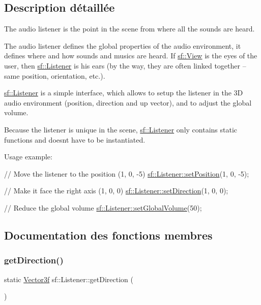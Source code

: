 \subsection{Description détaillée}
The audio listener is the point in the scene from where all the sounds are heard. 

The audio listener defines the global properties of the audio environment, it defines where and how sounds and musics are heard. If \hyperlink{classsf_1_1View}{sf\+::\+View} is the eyes of the user, then \hyperlink{classsf_1_1Listener}{sf\+::\+Listener} is his ears (by the way, they are often linked together -- same position, orientation, etc.).

\hyperlink{classsf_1_1Listener}{sf\+::\+Listener} is a simple interface, which allows to setup the listener in the 3D audio environment (position, direction and up vector), and to adjust the global volume.

Because the listener is unique in the scene, \hyperlink{classsf_1_1Listener}{sf\+::\+Listener} only contains static functions and doesn\textquotesingle{}t have to be instantiated.

Usage example\+: 
\begin{DoxyCode}
\textcolor{comment}{// Move the listener to the position (1, 0, -5)}
\hyperlink{classsf_1_1Listener_a5bc2d8d18ea2d8f339d23cbf17678564}{sf::Listener::setPosition}(1, 0, -5);

\textcolor{comment}{// Make it face the right axis (1, 0, 0)}
\hyperlink{classsf_1_1Listener_ae479dc15513c6557984d26e32d06d06e}{sf::Listener::setDirection}(1, 0, 0);

\textcolor{comment}{// Reduce the global volume}
\hyperlink{classsf_1_1Listener_a803a24a1fc04620cacc9f88c6fbc0e3a}{sf::Listener::setGlobalVolume}(50);
\end{DoxyCode}
 

\subsection{Documentation des fonctions membres}
\mbox{\label{classsf_1_1Listener_a54e91baba51d4431474f53ff7f9309f9}} 
\subsubsection{\texorpdfstring{get\+Direction()}{getDirection()}}
{\footnotesize\ttfamily static \hyperlink{classsf_1_1Vector3}{Vector3f} sf\+::\+Listener\+::get\+Direction (\begin{DoxyParamCaption}{ }\end{DoxyParamCaption})\hspace{0.3cm}{\ttfamily [static]}}



